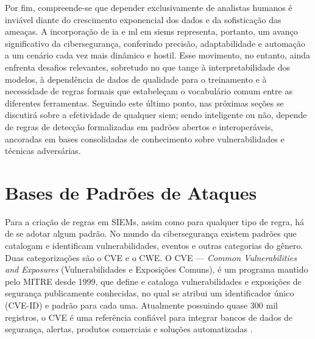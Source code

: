 
Por fim, compreende-se que depender exclusivamente de analistas humanos é inviável diante do crescimento exponencial dos dados e da sofisticação das ameaças. 
A incorporação de \gls{ia} e \gls{ml} em \gls{siem}s representa, portanto, um avanço significativo da cibersegurança, conferindo precisão, adaptabilidade e automação a um cenário cada vez mais dinâmico e hostil. 
Esse movimento, no entanto, ainda enfrenta desafios relevantes, sobretudo no que tange à interpretabilidade dos modelos, à dependência de dados de qualidade para o treinamento e à necessidade de regras formais que estabeleçam o vocabulário comum entre as diferentes ferramentas. 
Seguindo este último ponto, nas próximas seções se discutirá sobre a efetividade de qualquer \gls{siem}; sendo inteligente ou não, depende de regras de detecção formalizadas em padrões abertos e interoperáveis, ancoradas em bases consolidadas de conhecimento sobre vulnerabilidades e técnicas adversárias.


\section{Bases de Padrões de Ataques}

Para a criação de regras em SIEMs, assim como para qualquer tipo de regra, há de se adotar algum padrão.
No mundo da cibersegurança existem padrões que catalogam e identificam vulnerabilidades, eventos e outras categorias do gênero. 
Duas categorizações são o CVE e o CWE.
O CVE --- \textit{Common Vulnerabilities and Exposures} (Vulnerabilidades e Exposições Comuns), é um programa mantido pelo MITRE desde 1999, que define e cataloga vulnerabilidades e exposições de segurança publicamente conhecidas, no qual se atribui um identificador único (CVE-ID) e padrão para cada uma.
Atualmente possuindo quase 300 mil registros, o CVE é uma referência confiável para integrar bancos de dados de segurança, alertas, produtos comerciais e soluções automatizadas \cite{NIST_CVE_Process, CVE_History}.

